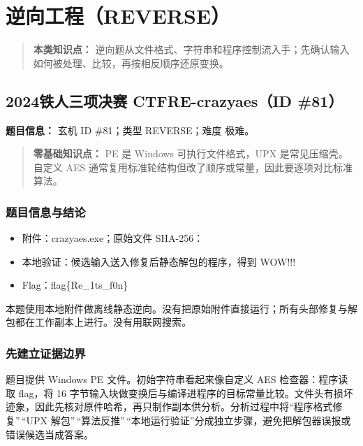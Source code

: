 \chapter{逆向工程（REVERSE）}\label{ux9006ux5411ux5de5ux7a0breverse}

\begin{quote}
\textbf{本类知识点：} 逆向题从文件格式、字符串和程序控制流入手；先确认输入如何被处理、比较，再按相反顺序还原变换。
\end{quote}

\section{2024铁人三项决赛 CTFRE-crazyaes（ID \#81）}\label{ux94c1ux4ebaux4e09ux9879ux51b3ux8d5b-ctfre-crazyaesid-81}

\textbf{题目信息：} 玄机 ID \#81；类型 REVERSE；难度 极难。

\begin{quote}
\textbf{零基础知识点：} PE 是 Windows 可执行文件格式，UPX 是常见压缩壳。自定义 AES 通常复用标准轮结构但改了顺序或常量，因此要逐项对比标准算法。
\end{quote}

\subsection{题目信息与结论}\label{ux9898ux76eeux4fe1ux606fux4e0eux7ed3ux8bba}

\begin{itemize}
\item
  附件：crazyaes.exe；原始文件 SHA-256：
\item
  本地验证：候选输入送入修复后静态解包的程序，得到 WOW!!!
\item
  Flag：flag\{Re\_1ts\_f0n\}
\end{itemize}

本题使用本地附件做离线静态逆向。没有把原始附件直接运行；所有头部修复与解包都在工作副本上进行。没有用联网搜索。

\subsection{先建立证据边界}\label{ux5148ux5efaux7acbux8bc1ux636eux8fb9ux754c}

题目提供 Windows PE 文件。初始字符串看起来像自定义 AES 检查器：程序读取 flag，将 16 字节输入块做变换后与编译进程序的目标常量比较。文件头有损坏迹象，因此先核对原件哈希，再只制作副本供分析。分析过程中将``程序格式修复''\,``UPX 解包''\,``算法反推''\,``本地运行验证''分成独立步骤，避免把解包器误报或错误候选当成答案。

